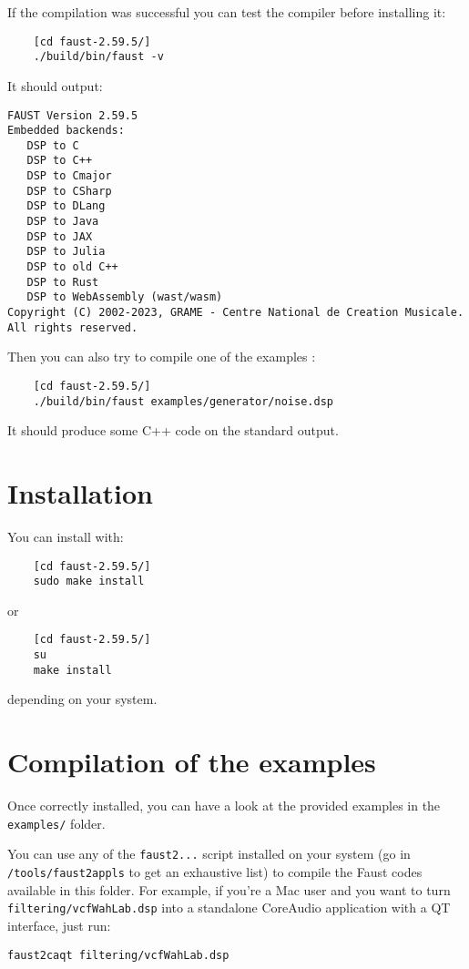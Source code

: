 If the compilation was successful you can test the compiler before installing it:
\begin{lstlisting}
	[cd faust-2.59.5/]
	./build/bin/faust -v
\end{lstlisting}
It should output:
\begin{lstlisting}
FAUST Version 2.59.5
Embedded backends: 
   DSP to C
   DSP to C++
   DSP to Cmajor
   DSP to CSharp
   DSP to DLang
   DSP to Java
   DSP to JAX
   DSP to Julia
   DSP to old C++
   DSP to Rust
   DSP to WebAssembly (wast/wasm)
Copyright (C) 2002-2023, GRAME - Centre National de Creation Musicale. All rights reserved. 
\end{lstlisting}

Then you can also try to compile one of the examples :
\begin{lstlisting}
	[cd faust-2.59.5/]
	./build/bin/faust examples/generator/noise.dsp
\end{lstlisting}
It should produce some C++ code on the standard output.

\section{Installation}
You can install \faust with:
\begin{lstlisting}
	[cd faust-2.59.5/]
	sudo make install
\end{lstlisting}
or
\begin{lstlisting}
	[cd faust-2.59.5/]
	su
	make install
\end{lstlisting}
depending on your system.

\section{Compilation of the examples}

Once \faust correctly installed, you can have a look at the provided examples in the \lstinline'examples/' folder. 

You can use any of the \lstinline'faust2...' script installed on your system (go in \lstinline'/tools/faust2appls' to get an exhaustive list) to compile the Faust codes available in this folder. For example, if you're a Mac user and you want to turn \lstinline'filtering/vcfWahLab.dsp' into a standalone CoreAudio application with a QT interface, just run:

\lstinline'faust2caqt filtering/vcfWahLab.dsp'

